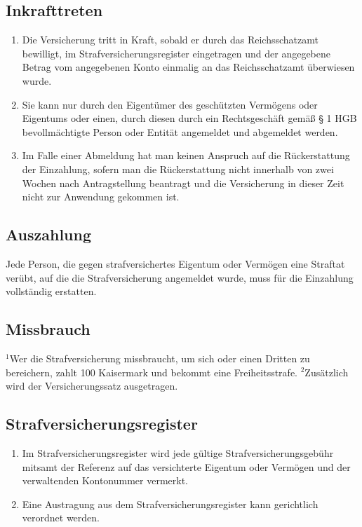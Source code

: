 \documentclass{article}
\begin{document}
\subsection{Inkrafttreten}
\begin{enumerate}[(1)]
    \item Die Versicherung tritt in Kraft, sobald er durch das Reichsschatzamt bewilligt, im Strafversicherungsregister eingetragen und der angegebene Betrag vom angegebenen Konto einmalig an das Reichsschatzamt überwiesen wurde.
    \item Sie kann nur durch den Eigentümer des geschützten Vermögens oder Eigentums oder einen, durch diesen durch ein Rechtsgeschäft gemäß § 1 HGB bevollmächtigte Person oder Entität angemeldet und abgemeldet werden.
    \item Im Falle einer Abmeldung hat man keinen Anspruch auf die Rückerstattung der Einzahlung, sofern man die Rückerstattung nicht innerhalb von zwei Wochen nach Antragstellung beantragt und die Versicherung in dieser Zeit nicht zur Anwendung gekommen ist.
\end{enumerate}

\subsection{Auszahlung}
Jede Person, die gegen strafversichertes Eigentum oder Vermögen eine Straftat verübt, auf die die Strafversicherung angemeldet wurde, muss für die Einzahlung vollständig erstatten.

\subsection{Missbrauch}
${^1}$Wer die Strafversicherung missbraucht, um sich oder einen Dritten zu bereichern, zahlt 100 Kaisermark und bekommt eine Freiheitsstrafe. ${^2}$Zusätzlich wird der Versicherungssatz ausgetragen.

\subsection{Strafversicherungsregister}
\begin{enumerate}[(1)]
    \item Im Strafversicherungsregister wird jede gültige Strafversicherungsgebühr mitsamt der Referenz auf das versichterte Eigentum oder Vermögen und der verwaltenden Kontonummer vermerkt.
    \item Eine Austragung aus dem Strafversicherungsregister kann gerichtlich verordnet werden.
\end{enumerate}
\end{document}
